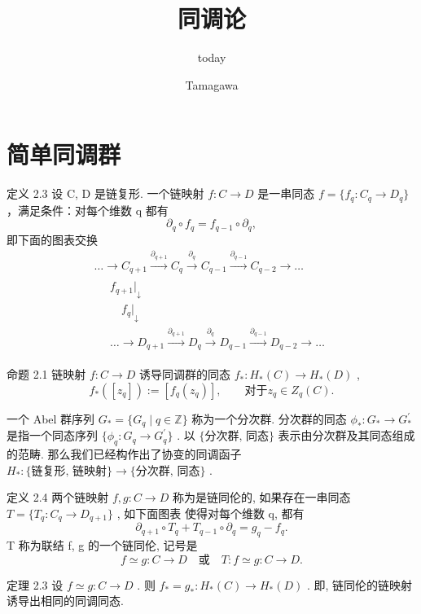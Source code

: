 \documentclass[]{article}
\title{同调论}
\author{today}
\author{Tamagawa}
\begin{document}
	
\maketitle

\section{简单同调群}

定义 2.3 设 C, D 是链复形. 一个链映射 $f: C \rightarrow D$ 是一串同态 $f = \{f_q : C_q \rightarrow D_q\}$ ，满足条件：对每个维数 q 都有 $$
\partial_ {q} \circ f _ {q} = f _ {q - 1} \circ \partial_ {q},
$$即下面的图表交换 
$$
\begin{array}{l} \dots \longrightarrow C _ {q + 1} \xrightarrow {\partial_ {q + 1}} C _ {q} \xrightarrow {\partial_ {q}} C _ {q - 1} \xrightarrow {\partial_ {q - 1}} C _ {q - 2} \longrightarrow \dots \\ \quad \left. \begin{array}{c} f _ {q + 1} \Bigg | _ {\downarrow} \\ \quad f _ {q} \Bigg | _ {\downarrow} \\ \dots \longrightarrow D _ {q + 1} \xrightarrow {\partial_ {q + 1}} D _ {q} \xrightarrow {\partial_ {q}} D _ {q - 1} \xrightarrow {\partial_ {q - 1}} D _ {q - 2} \longrightarrow \dots \end{array} \right. \end{array}
$$

命题 2.1 链映射 $f: C \rightarrow D$ 诱导同调群的同态 $f_{*}: H_{*}(C) \rightarrow H_{*}(D)$ ,$$
f _ {*} ([ z _ {q} ]) := [ f _ {q} (z _ {q}) ], \qquad {\text {对于}} z _ {q} \in Z _ {q} (C).
$$

一个 Abel 群序列 $G_{*} = \{G_{q} \mid q \in \mathbb{Z}\}$ 称为一个分次群. 分次群的同态 $\phi_{*}: G_{*} \to G_{*}^{\prime}$ 是指一个同态序列 $\{\phi_{q}: G_{q} \to G_{q}^{\prime}\}$ . 以 $\{\text{分次群, 同态}\}$ 表示由分次群及其同态组成的范畴. 那么我们已经构作出了协变的同调函子 $H_{*}: \{\text{链复形, 链映射}\} \to \{\text{分次群, 同态}\}$ . 

定义 2.4 两个链映射 $f, g: C \to D$ 称为是链同伦的, 如果存在一串同态 $T = \{T_q : C_q \to D_{q+1}\}$ , 如下面图表 使得对每个维数 q, 都有 
$$
\partial_ {q + 1} \circ T _ {q} + T _ {q - 1} \circ \partial_ {q} = g _ {q} - f _ {q}.
$$T 称为联结 f, g 的一个链同伦, 记号是 $$
f \simeq g: C \to D \quad {\text {或}} \quad T: f \simeq g: C \to D.
$$

定理 2.3 设 $f \simeq g: C \to D$ . 则 $f_{*} = g_{*}: H_{*}(C) \to H_{*}(D)$ . 即, 链同伦的链映射诱导出相同的同调同态. 
\end{document}
